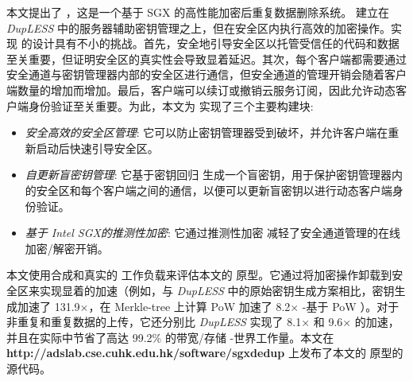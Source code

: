 本文提出了 \sysnameS，这是一个基于 SGX 的高性能加密后重复数据删除系统。 \sysnameS 建立在 {\em DupLESS} \cite{bellare2013DupLESS} 中的服务器辅助密钥管理之上，但在安全区内执行高效的加密操作。实现 \sysnameS 的设计具有不小的挑战。首先，安全地引导安全区以托管受信任的代码和数据至关重要，但证明安全区的真实性会导致显着延迟。其次，每个客户端都需要通过安全通道与密钥管理器内部的安全区进行通信，但安全通道的管理开销会随着客户端数量的增加而增加。最后，客户端可以续订或撤销云服务订阅，因此允许动态客户端身份验证至关重要。为此，本文为 \sysnameS 实现了三个主要构建块: 

\begin{itemize}[leftmargin=*]
    \item \textit{安全高效的安全区管理}:
        它可以防止密钥管理器受到破坏，并允许客户端在重新启动后快速引导安全区。
    \item \textit{自更新盲密钥管理}:
        它基于密钥回归 \cite{fu06} 生成一个盲密钥，用于保护密钥管理器内的安全区和每个客户端之间的通信，以便可以更新盲密钥以进行动态客户端身份验证。
    \item \textit{基于 Intel SGX的推测性加密}:
        它通过推测性加密 \cite{eduardo19} 减轻了安全通道管理的在线加密/解密开销。
\end{itemize}

本文使用合成和真实的 \cite{fsl,meyer11} 工作负载来评估本文的 \sysnameS 原型。它通过将加密操作卸载到安全区来实现显着的加速（例如，与 {\em DupLESS} \cite{bellare2013DupLESS} 中的原始密钥生成方案相比，密钥生成加速了 131.9$\times$，在 Merkle-tree 上计算 PoW 加速了 8.2$\times$ -基于 PoW \cite{halevi11}）。对于非重复和重复数据的上传，它还分别比 {\em DupLESS} \cite{bellare2013DupLESS} 实现了 8.1$\times$ 和 9.6$\times$ 的加速，并且在实际中节省了高达 99.2\% 的带宽/存储 -世界工作量。本文在 {\bf http://adslab.cse.cuhk.edu.hk/software/sgxdedup} 上发布了本文的 \sysnameS 原型的源代码。 

